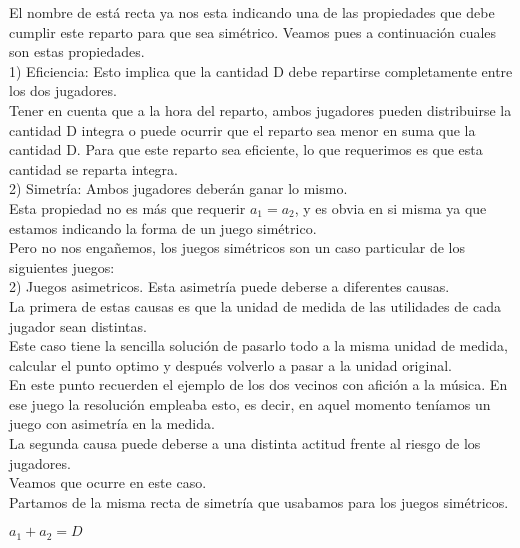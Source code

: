 \documentclass[10pt,a4paper]{book}
\begin{document}
El nombre de está recta ya nos esta indicando una de las propiedades que debe cumplir este reparto para que sea simétrico. Veamos pues a continuación cuales son estas propiedades.\\

	1) Eficiencia: Esto implica que la cantidad D debe repartirse completamente entre los dos jugadores.\\

Tener en cuenta que a la hora del reparto, ambos jugadores pueden distribuirse la cantidad D integra o puede ocurrir que el reparto sea menor en suma que la cantidad D. Para que este reparto sea eficiente, lo que requerimos es que esta cantidad se reparta integra.\\
	
	2) Simetría: Ambos jugadores deberán ganar lo mismo.\\
Esta propiedad no es más que requerir $a_1=a_2$, y es obvia en si misma ya que estamos indicando la forma de un juego simétrico.\\


Pero no nos engañemos, los juegos simétricos son un caso particular de los siguientes juegos:\\

2) Juegos asimetricos. Esta asimetría puede deberse a diferentes causas.\\

La primera de estas causas es que la unidad de medida de las utilidades de cada jugador sean distintas. \\

Este caso tiene la sencilla solución de pasarlo todo a la misma unidad de medida, calcular el punto optimo y después volverlo a pasar a la unidad original.\\

En este punto recuerden el ejemplo de los dos vecinos con afición a la música. En ese juego la resolución empleaba esto, es decir, en aquel momento teníamos un juego con asimetría en la medida.\\

La segunda causa puede deberse a una distinta actitud frente al riesgo de los jugadores.\\

Veamos que ocurre en este caso. \\

Partamos de la misma recta de simetría que usabamos para los juegos simétricos.\\

\begin{center}

$a_1 + a_2=D$

\end{center}
\end{document}
